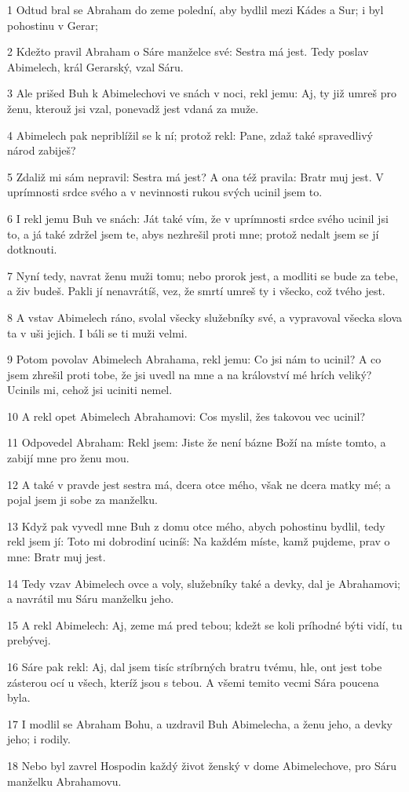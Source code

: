 \par 1 Odtud bral se Abraham do zeme polední, aby bydlil mezi Kádes a Sur; i byl pohostinu v Gerar;
\par 2 Kdežto pravil Abraham o Sáre manželce své: Sestra má jest. Tedy poslav Abimelech, král Gerarský, vzal Sáru.
\par 3 Ale prišed Buh k Abimelechovi ve snách v noci, rekl jemu: Aj, ty již umreš pro ženu, kterouž jsi vzal, ponevadž jest vdaná za muže.
\par 4 Abimelech pak nepriblížil se k ní; protož rekl: Pane, zdaž také spravedlivý národ zabiješ?
\par 5 Zdaliž mi sám nepravil: Sestra má jest? A ona též pravila: Bratr muj jest. V uprímnosti srdce svého a v nevinnosti rukou svých ucinil jsem to.
\par 6 I rekl jemu Buh ve snách: Ját také vím, že v uprímnosti srdce svého ucinil jsi to, a já také zdržel jsem te, abys nezhrešil proti mne; protož nedalt jsem se jí dotknouti.
\par 7 Nyní tedy, navrat ženu muži tomu; nebo prorok jest, a modliti se bude za tebe, a živ budeš. Pakli jí nenavrátíš, vez, že smrtí umreš ty i všecko, což tvého jest.
\par 8 A vstav Abimelech ráno, svolal všecky služebníky své, a vypravoval všecka slova ta v uši jejich. I báli se ti muži velmi.
\par 9 Potom povolav Abimelech Abrahama, rekl jemu: Co jsi nám to ucinil? A co jsem zhrešil proti tobe, že jsi uvedl na mne a na království mé hrích veliký? Ucinils mi, cehož jsi uciniti nemel.
\par 10 A rekl opet Abimelech Abrahamovi: Cos myslil, žes takovou vec ucinil?
\par 11 Odpovedel Abraham: Rekl jsem: Jiste že není bázne Boží na míste tomto, a zabijí mne pro ženu mou.
\par 12 A také v pravde jest sestra má, dcera otce mého, však ne dcera matky mé; a pojal jsem ji sobe za manželku.
\par 13 Když pak vyvedl mne Buh z domu otce mého, abych pohostinu bydlil, tedy rekl jsem jí: Toto mi dobrodiní uciníš: Na každém míste, kamž pujdeme, prav o mne: Bratr muj jest.
\par 14 Tedy vzav Abimelech ovce a voly, služebníky také a devky, dal je Abrahamovi; a navrátil mu Sáru manželku jeho.
\par 15 A rekl Abimelech: Aj, zeme má pred tebou; kdežt se koli príhodné býti vidí, tu prebývej.
\par 16 Sáre pak rekl: Aj, dal jsem tisíc stríbrných bratru tvému, hle, ont jest tobe zásterou ocí u všech, kteríž jsou s tebou. A všemi temito vecmi Sára poucena byla.
\par 17 I modlil se Abraham Bohu, a uzdravil Buh Abimelecha, a ženu jeho, a devky jeho; i rodily.
\par 18 Nebo byl zavrel Hospodin každý život ženský v dome Abimelechove, pro Sáru manželku Abrahamovu.

